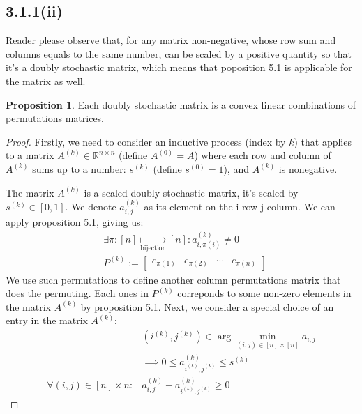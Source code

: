 \documentclass[]{article}
\theoremstyle{definition}
\newtheorem{prop}{Proposition}[section]  %
\begin{document}
    \subsection{3.1.1(ii)}
        Reader please observe that, for any matrix non-negative, whose row sum and columns equals to the same number, can be scaled by a positive quantity so that it's a doubly stochastic matrix, which means that poposition 5.1 is applicable for the matrix as well. 
        \begin{prop}
            Each doubly stochastic matrix is a convex linear combinations of permutations matrices. 
        \end{prop}
        \begin{proof}
            Firstly, we need to consider an inductive process (index by $k$) that applies to a matrix $A^{(k)}\in \mathbb R^{n\times n}$ (define $A^{(0)} = A$) where each row and column of $A^{(k)}$ sums up to a number: $s^{(k)}$ (define $s^{(0)} = 1$), and $A^{(k)}$ is nonegative. 
            \par
            The matrix $A^{(k)}$ is a scaled doubly stochastic matrix, it's scaled by $s^{(k)}\in [0, 1]$. We denote $a_{i, j}^{(k)}$ as its element on the i row j column. We can apply proposition 5.1, giving us: 
            \begin{align}
                & 
                \exists \pi: [n]\underset{\text{bijection}}{\mapsto}[n]: 
                a^{(k)}_{i,\pi(i)}\neq 0
                \\
                & 
                P^{(k)} := \begin{bmatrix}
                    e_{\pi(1)} & e_{\pi(2)}& \cdots & e_{\pi(n)}
                \end{bmatrix}
            \end{align}
            We use such permutations to define another column permutations matrix that does the permuting. Each ones in $P^{(k)}$ correponds to some non-zero elements in the matrix $A^{(k)}$ by proposition 5.1. Next, we consider a special choice of an entry in the matrix $A^{(k)}$: 
            \begin{align}
                & (i^{(k)}, j^{(k)}) \in \arg\min_{(i, j)\in [n]\times [n]}
                a_{i, j}
                \\
                & \implies 0 \le a^{(k)}_{i^{(k)}, j^{(k)}} \le s^{(k)}
                \\
                \forall (i, j)\in [n]\times n: 
                & a^{(k)}_{i, j} - a^{(k)}_{i^{(k)}, j^{(k)}} \ge 0

\end{align}
\end{proof}
\end{document}
